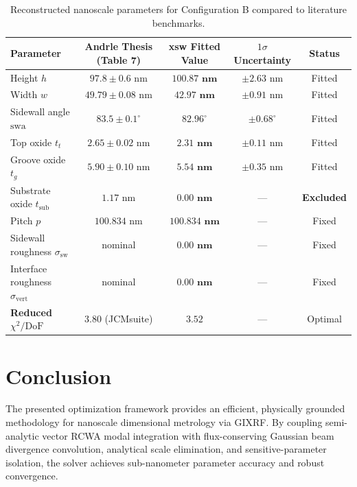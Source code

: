 \documentclass[11pt,a4paper]{article}
\newcommand{\DoF}{\mathrm{DoF}}
\begin{document}
\begin{table}[htbp]
\centering
\small
\caption{Reconstructed nanoscale parameters for Configuration B compared to literature benchmarks.}
\vspace{4pt}
\begin{tabular*}{\textwidth}{@{\extracolsep{\fill}}lcccc@{}}
\toprule
\textbf{Parameter} & \textbf{Andrle Thesis (Table 7)} & \textbf{xsw Fitted Value} & \textbf{$1\sigma$ Uncertainty} & \textbf{Status} \\
\midrule
Height $h$ & $97.8 \pm 0.6\text{ nm}$ & $\mathbf{100.87\text{ nm}}$ & $\pm 2.63\text{ nm}$ & Fitted \\
Width $w$ & $49.79 \pm 0.08\text{ nm}$ & $\mathbf{42.97\text{ nm}}$ & $\pm 0.91\text{ nm}$ & Fitted \\
Sidewall angle $\mathrm{swa}$ & $83.5 \pm 0.1^\circ$ & $\mathbf{82.96^\circ}$ & $\pm 0.68^\circ$ & Fitted \\
Top oxide $t_t$ & $2.65 \pm 0.02\text{ nm}$ & $\mathbf{2.31\text{ nm}}$ & $\pm 0.11\text{ nm}$ & Fitted \\
Groove oxide $t_g$ & $5.90 \pm 0.10\text{ nm}$ & $\mathbf{5.54\text{ nm}}$ & $\pm 0.35\text{ nm}$ & Fitted \\
Substrate oxide $t_{\mathrm{sub}}$ & $1.17\text{ nm}$ & $\mathbf{0.00\text{ nm}}$ & --- & \textbf{Excluded} \\
Pitch $p$ & $100.834\text{ nm}$ & $\mathbf{100.834\text{ nm}}$ & --- & Fixed \\
Sidewall roughness $\sigma_{\mathrm{sw}}$ & nominal & $\mathbf{0.00\text{ nm}}$ & --- & Fixed \\
Interface roughness $\sigma_{\mathrm{vert}}$ & nominal & $\mathbf{0.00\text{ nm}}$ & --- & Fixed \\
\midrule
\textbf{Reduced $\chi^2 / \DoF$} & $3.80$ (JCMsuite) & $\mathbf{3.52}$ & --- & Optimal \\
\bottomrule
\end{tabular*}
\end{table}

\section{Conclusion}
The presented optimization framework provides an efficient, physically grounded methodology for nanoscale dimensional metrology via GIXRF. By coupling semi-analytic vector RCWA modal integration with flux-conserving Gaussian beam divergence convolution, analytical scale elimination, and sensitive-parameter isolation, the solver achieves sub-nanometer parameter accuracy and robust convergence.
\end{document}
